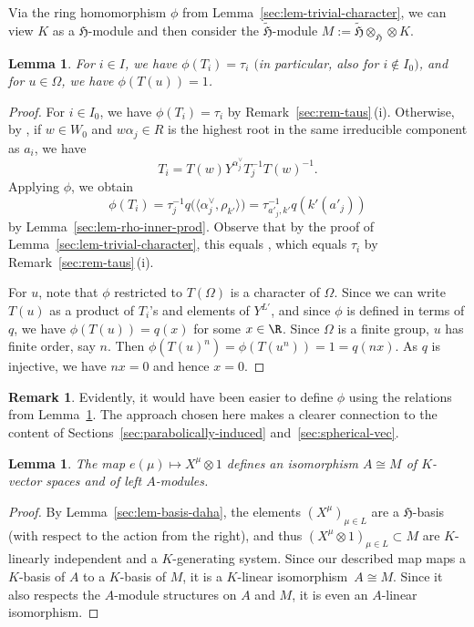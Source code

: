 \documentclass[pdftex]{sigma}
\newtheorem{Lemma}[Theorem]{Lemma}
\theoremstyle{definition}
\newtheorem{Remark}[Theorem]{Remark}
\numberwithin{equation}{section}
\begin{document}
Via the ring homomorphism $\phi$ from Lemma~\ref{sec:lem-trivial-character}, we can view $K$ as a $\mathfrak{H}$-module and then consider
the $\tilde{\mathfrak{H}}$-module $M:=\tilde{\mathfrak{H}}\otimes_{\mathfrak{H}}\otimes K$.

\begin{Lemma}\label{sec:lem-phi-values}
 For $i\in I$, we have $\phi(T_i)=\tau_i$ $($in particular, also for
 $i\not\in I_0)$, and for $u\in\Omega$, we have
$\phi(T(u))=1$.
\end{Lemma}
\begin{proof}
 For $i\in I_0$, we have $\phi(T_i)=\tau_i$ by Remark~\ref{sec:rem-taus}\,(i). Otherwise,
 by \cite[equation~(3.3.5)]{macdonald}, if $w\in W_0$ and
 $w\alpha_j\in R$ is the highest
 root in the same irreducible component as $a_i$, we have
 \[
 T_i = T(w) Y^{\alpha_j^\vee} T_j^{-1} T(w)^{-1}.
 \]
 Applying $\phi$, we obtain
 \[
 \phi(T_i) = \tau_j^{-1} q\bigl(\big\langle\alpha_j^\vee,\rho_{k'}\big\rangle\bigr)
 = \tau_{a'_j,k'}^{-1} q(k'(a'_j))
 \]
 by Lemma~\ref{sec:lem-rho-inner-prod}. Observe that by the proof of
 Lemma~\ref{sec:lem-trivial-character}, this equals
 , which equals $\tau_i$ by Remark~\ref{sec:rem-taus}\,(i).

 For $u$, note that $\phi$ restricted to $T(\Omega)$ is a character of
 $\Omega$. Since we can write $T(u)$ as a product of $T_i$'s and elements of $Y^{L'}$, and since $\phi$ is defined in terms of $q$,
 we have $\phi(T(u))=q(x)$ for some $x\in\R$. Since $\Omega$ is a finite group,
 $u$ has finite order, say $n$. Then $\phi(T(u)^n)=\phi(T(u^n))=1=q(nx)$.
 As $q$ is injective, we have $nx=0$ and hence $x=0$.
\end{proof}

\begin{Remark}
 Evidently, it would have been easier to define $\phi$ using the
 relations from Lem\-ma~\ref{sec:lem-phi-values}. The approach chosen here
 makes a clearer connection to the content of Sections~\ref{sec:parabolically-induced} and~\ref{sec:spherical-vec}.
\end{Remark}

\begin{Lemma}\label{sec:lem-induced-rep-iso}
 The map $e(\mu)\mapsto X^\mu\otimes 1$ defines an isomorphism
 $A\cong M$ of $K$-vector spaces and of left $A$-modules.
\end{Lemma}
\begin{proof}
 By Lemma~\ref{sec:lem-basis-daha}, the elements $(X^\mu)_{\mu\in L}$ are
 a $\mathfrak{H}$-basis (with respect to the action from the right),
 and thus $(X^\mu\otimes 1)_{\mu\in L}\subset M$ are $K$-linearly independent
 and a $K$-generating system. Since our described map maps a $K$-basis
 of $A$ to a $K$-basis of $M$, it is a $K$-linear isomorphism~${A\cong M}$. Since it also respects the $A$-module structures on $A$ and
 $M$, it is even an $A$-linear isomorphism.
\end{proof}
\end{document}
